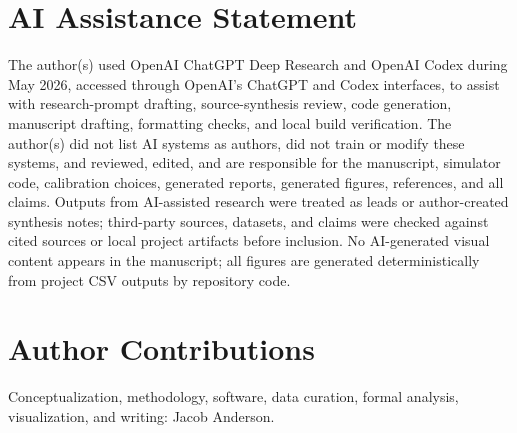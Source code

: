 \documentclass[11pt]{article}
\begin{document}
\section*{AI Assistance Statement}

The author(s) used OpenAI ChatGPT Deep Research and OpenAI Codex during May 2026, accessed through OpenAI's ChatGPT and Codex interfaces, to assist with research-prompt drafting, source-synthesis review, code generation, manuscript drafting, formatting checks, and local build verification. The author(s) did not list AI systems as authors, did not train or modify these systems, and reviewed, edited, and are responsible for the manuscript, simulator code, calibration choices, generated reports, generated figures, references, and all claims. Outputs from AI-assisted research were treated as leads or author-created synthesis notes; third-party sources, datasets, and claims were checked against cited sources or local project artifacts before inclusion. No AI-generated visual content appears in the manuscript; all figures are generated deterministically from project CSV outputs by repository code.

\section*{Author Contributions}

Conceptualization, methodology, software, data curation, formal analysis, visualization, and writing: Jacob Anderson.
\end{document}
